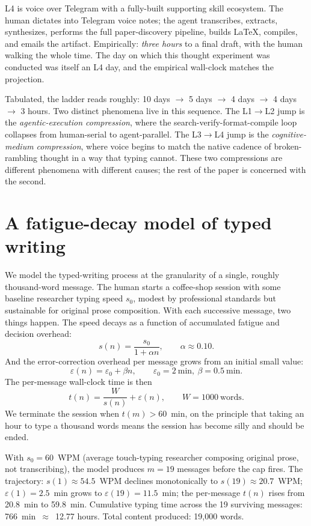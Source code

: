 \documentclass[11pt]{article}
\begin{document}
L4 is voice over Telegram with a fully-built supporting skill ecosystem. The human dictates into Telegram voice notes; the agent transcribes, extracts, synthesizes, performs the full paper-discovery pipeline, builds LaTeX, compiles, and emails the artifact. Empirically: \emph{three hours} to a final draft, with the human walking the whole time. The day on which this thought experiment was conducted was itself an L4 day, and the empirical wall-clock matches the projection.

Tabulated, the ladder reads roughly: 10 days $\rightarrow$ 5 days $\rightarrow$ 4 days $\rightarrow$ 4 days $\rightarrow$ 3 hours. Two distinct phenomena live in this sequence. The L1$\rightarrow$L2 jump is the \emph{agentic-execution compression}, where the search-verify-format-compile loop collapses from human-serial to agent-parallel. The L3$\rightarrow$L4 jump is the \emph{cognitive-medium compression}, where voice begins to match the native cadence of broken-rambling thought in a way that typing cannot. These two compressions are different phenomena with different causes; the rest of the paper is concerned with the second.

\section{A fatigue-decay model of typed writing}

We model the typed-writing process at the granularity of a single, roughly thousand-word message. The human starts a coffee-shop session with some baseline researcher typing speed $s_0$, modest by professional standards but sustainable for original prose composition. With each successive message, two things happen. The speed decays as a function of accumulated fatigue and decision overhead:
\[
s(n) = \frac{s_0}{1 + \alpha n}, \qquad \alpha \approx 0.10.
\]
And the error-correction overhead per message grows from an initial small value:
\[
\varepsilon(n) = \varepsilon_0 + \beta n, \qquad \varepsilon_0 = 2~\text{min},~ \beta = 0.5~\text{min}.
\]
The per-message wall-clock time is then
\[
t(n) = \frac{W}{s(n)} + \varepsilon(n), \qquad W = 1000~\text{words}.
\]
We terminate the session when $t(m) > 60$~min, on the principle that taking an hour to type a thousand words means the session has become silly and should be ended.

With $s_0 = 60$~WPM (average touch-typing researcher composing original prose, not transcribing), the model produces $m = 19$ messages before the cap fires. The trajectory: $s(1) \approx 54.5$~WPM declines monotonically to $s(19) \approx 20.7$~WPM; $\varepsilon(1) = 2.5$~min grows to $\varepsilon(19) = 11.5$~min; the per-message $t(n)$ rises from 20.8~min to 59.8~min. Cumulative typing time across the 19 surviving messages: 766~min~$\approx$~12.77 hours. Total content produced: 19{,}000 words.
\end{document}
